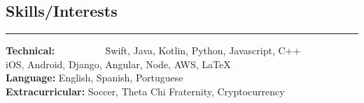 \documentclass{res}
\begin{document}
\begin{resume}
\section{{\large Skills/Interests}}

\vspace{-10pt}

\noindent\rule{\resumewidth}{0.4pt}  

\vspace{-15pt}

\begin{tabbing}
{\bf Technical: } ~~~~~~~~~ \= Swift, Java, Kotlin, Python, Javascript, C++  \\
\>  iOS, Android, Django, Angular, Node, AWS, \LaTeX \\
{\bf Language: } \> English, Spanish, Portuguese\\
{\bf Extracurricular: } \> Soccer, Theta Chi Fraternity, Cryptocurrency \\
\end{tabbing}

\end{resume} 
\end{document}
